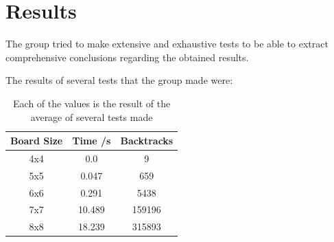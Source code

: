 \documentclass{llncs}
\begin{document}
%
\section{Results}

The group tried to make extensive and exhaustive tests to be able to extract comprehensive conclusions regarding the obtained results.

The results of several tests that the group made were:

\begin{table}[]
\centering
\caption{Each of the values is the result of the average of several tests made}
\label{Results Tablel}
\begin{tabular}{@{}ccc@{}}
\toprule
\multicolumn{1}{c|}{\textbf{Board Size}} & \multicolumn{1}{c|}{\textbf{Time /s}} & \textbf{Backtracks} \\ \midrule
4x4                                      & 0.0                                 & 9                   \\ \midrule
5x5                                      & 0.047                                 & 659                 \\ \midrule
6x6                                      & 0.291                                 & 5438                \\ \midrule
7x7                                      & 10.489                                & 159196              \\ \midrule
8x8                                      & 18.239                                & 315893              \\ \bottomrule
\end{tabular}
\end{table}
\end{document}
